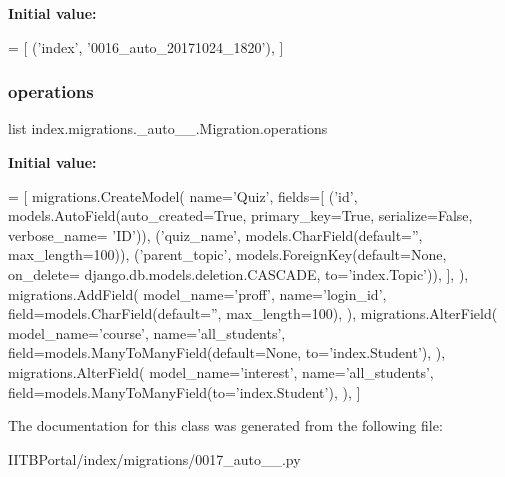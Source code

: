 {\bfseries Initial value\+:}
\begin{DoxyCode}
=  [
        (\textcolor{stringliteral}{'index'}, \textcolor{stringliteral}{'0016\_auto\_20171024\_1820'}),
    ]
\end{DoxyCode}
\mbox{\label{classindex_1_1migrations_1_10017__auto__20171025__1637_1_1Migration_acb8ad637ba810e819c25eb29bfe79b00}} 
\subsubsection{\texorpdfstring{operations}{operations}}
{\footnotesize\ttfamily list index.\+migrations.\+\_\+auto\+\_\+\_.\+Migration.\+operations\hspace{0.3cm}{\ttfamily [static]}}

{\bfseries Initial value\+:}
\begin{DoxyCode}
=  [
        migrations.CreateModel(
            name=\textcolor{stringliteral}{'Quiz'},
            fields=[
                (\textcolor{stringliteral}{'id'}, models.AutoField(auto\_created=\textcolor{keyword}{True}, primary\_key=\textcolor{keyword}{True}, serialize=\textcolor{keyword}{False}, verbose\_name=\textcolor{stringliteral}{
      'ID'})),
                (\textcolor{stringliteral}{'quiz\_name'}, models.CharField(default=\textcolor{stringliteral}{''}, max\_length=100)),
                (\textcolor{stringliteral}{'parent\_topic'}, models.ForeignKey(default=\textcolor{keywordtype}{None}, on\_delete=
      django.db.models.deletion.CASCADE, to=\textcolor{stringliteral}{'index.Topic'})),
            ],
        ),
        migrations.AddField(
            model\_name=\textcolor{stringliteral}{'proff'},
            name=\textcolor{stringliteral}{'login\_id'},
            field=models.CharField(default=\textcolor{stringliteral}{''}, max\_length=100),
        ),
        migrations.AlterField(
            model\_name=\textcolor{stringliteral}{'course'},
            name=\textcolor{stringliteral}{'all\_students'},
            field=models.ManyToManyField(default=\textcolor{keywordtype}{None}, to=\textcolor{stringliteral}{'index.Student'}),
        ),
        migrations.AlterField(
            model\_name=\textcolor{stringliteral}{'interest'},
            name=\textcolor{stringliteral}{'all\_students'},
            field=models.ManyToManyField(to=\textcolor{stringliteral}{'index.Student'}),
        ),
    ]
\end{DoxyCode}


The documentation for this class was generated from the following file\+:\begin{DoxyCompactItemize}
\item 
I\+I\+T\+B\+Portal/index/migrations/0017\+\_\+auto\+\_\+\_.\+py\end{DoxyCompactItemize}
